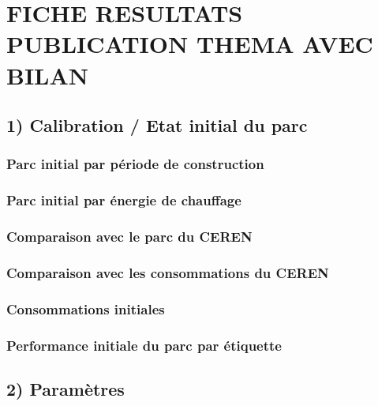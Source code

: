 \documentclass[]{article}
\title{}
\author{}
\date{}
\begin{document}
\section{FICHE RESULTATS PUBLICATION THEMA AVEC
BILAN}\label{fiche-resultats-publication-thema-avec-bilan}

\subsection{1) Calibration / Etat initial du
parc}\label{calibration-etat-initial-du-parc}

\subsubsection{Parc initial par période de
construction}\label{parc-initial-par-periode-de-construction}

\subsubsection{Parc initial par énergie de
chauffage}\label{parc-initial-par-energie-de-chauffage}

\subsubsection{Comparaison avec le parc du
CEREN}\label{comparaison-avec-le-parc-du-ceren}

\subsubsection{Comparaison avec les consommations du
CEREN}\label{comparaison-avec-les-consommations-du-ceren}

\subsubsection{Consommations initiales}\label{consommations-initiales}

\subsubsection{Performance initiale du parc par
étiquette}\label{performance-initiale-du-parc-par-etiquette}

\clearpage
\pagebreak

\subsection{2) Paramètres}\label{parametres}
\end{document}
